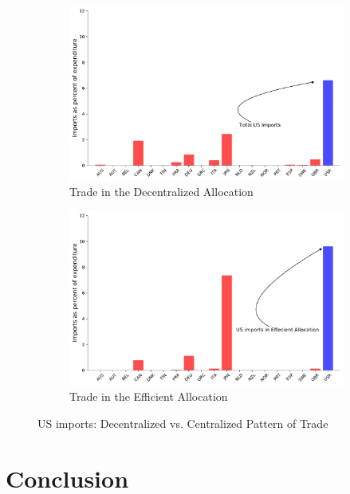 \documentclass[12pt,pdftex]{article}
\begin{document}
\begin{onehalfspacing}
\begin{figure}[!t]
\begin{subfigure}{0.5\textwidth}
    \includegraphics[scale = 0.36]{./figures/decentralized-trade-us.pdf}
    \caption{{Trade in the Decentralized Allocation}}\label{fig:us-data-trade}
\end{subfigure}
\hspace{0.01cm}
\begin{subfigure}{0.5\textwidth}
    \includegraphics[scale = 0.36]{./figures/planner-trade-us.pdf}
    \caption{{Trade in the Efficient Allocation}}\label{fig:us-planner-trade}
\end{subfigure}
\caption{US imports: Decentralized vs. Centralized Pattern of Trade}\label{fig:planner-vs-data}
\end{figure}


\section{Conclusion}


\end{onehalfspacing}
\end{document}
